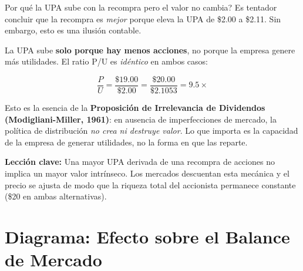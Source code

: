 \documentclass[12pt,a4paper]{article}
\begin{document}
\vspace{1cm}

\begin{cajareflexion}{\textquestiondown Por qu\'e la UPA sube con la recompra pero el valor no cambia?}
Es tentador concluir que la recompra es \emph{mejor} porque eleva la UPA de
\$2.00 a \$2.11. Sin embargo, esto es una ilusi\'on contable.

La UPA sube \textbf{solo porque hay menos acciones}, no porque la empresa
genere m\'as utilidades. El ratio P/U es \emph{id\'entico} en ambos casos:

\[
\frac{P}{U} = \frac{\$19.00}{\$2.00} = \frac{\$20.00}{\$2.1053} = 9.5\times
\]

Esto es la esencia de la \textbf{Proposici\'on de Irrelevancia de Dividendos
(Modigliani-Miller, 1961)}: en ausencia de imperfecciones de mercado, la
pol\'itica de distribuci\'on \emph{no crea ni destruye valor}. Lo que importa
es la capacidad de la empresa de generar utilidades, no la forma en que las
reparte.

\medskip
\textbf{Lecci\'on clave:} Una mayor UPA derivada de una recompra de acciones
no implica un mayor valor intr\'inseco. Los mercados descuentan esta mec\'anica
y el precio se ajusta de modo que la riqueza total del accionista permanece
constante (\$20 en ambas alternativas).
\end{cajareflexion}

\vspace{1cm}

\newpage
\section*{Diagrama: Efecto sobre el Balance de Mercado}

\vspace{0.5cm}
\end{document}
